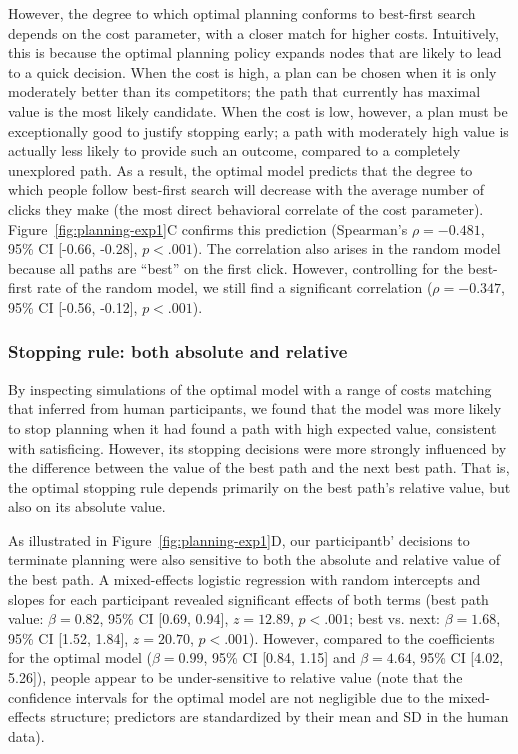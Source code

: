However, the degree to which optimal planning conforms to best-first search depends on the cost parameter, with a closer match for higher costs.
Intuitively, this is because the optimal planning policy expands nodes that are likely to lead to a quick decision. When the cost is high, a plan can be chosen when it is only moderately better than its competitors; the path that currently has maximal value is the most likely candidate. When the cost is low, however, a plan must be exceptionally good to justify stopping early; a path with moderately high value is actually less likely to provide such an outcome, compared to a completely unexplored path.
As a result, the optimal model predicts that the degree to which people follow best-first search will decrease with the average number of clicks they make (the most direct behavioral correlate of the cost parameter). Figure~\ref{fig:planning-exp1}C confirms this prediction (Spearman's $\rho=-0.481$, 95\% CI [-0.66, -0.28], $p < .001$). The correlation also arises in the random model because all paths are ``best'' on the first click. However, controlling for the best-first rate of the random model, we still find a significant correlation ($\rho=-0.347$, 95\% CI [-0.56, -0.12], $p < .001$).

\subsubsection{Stopping rule: both absolute and relative}\label{sec:planning-stopping}
By inspecting simulations of the optimal model with a range of costs matching that inferred from human participants, we found that the model was more likely to stop planning when it had found a path with high expected value, consistent with satisficing. However, its stopping decisions were more strongly influenced by the difference between the value of the best path and the next best path. That is, the optimal stopping rule depends primarily on the best path's relative value, but also on its absolute value.

As illustrated in Figure~\ref{fig:planning-exp1}D, our participantb' decisions to terminate planning were also sensitive to both the absolute and relative value of the best path. A mixed-effects logistic regression with random intercepts and slopes for each participant revealed significant effects of both terms (best path value: $\beta = 0.82$, 95\% CI [0.69, 0.94], $z = 12.89$, $p < .001$; best vs. next: $\beta = 1.68$, 95\% CI [1.52, 1.84], $z = 20.70$, $p < .001$). However, compared to the coefficients for the optimal model ($\beta = 0.99$, 95\% CI [0.84, 1.15] and $\beta = 4.64$, 95\% CI [4.02, 5.26]), people appear to be under-sensitive to relative value (note that the confidence intervals for the optimal model are not negligible due to the mixed-effects structure; predictors are standardized by their mean and SD in the human data).

